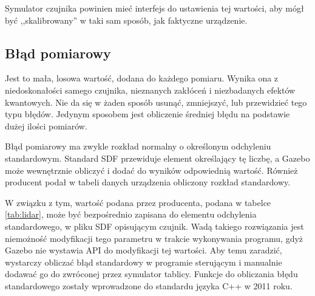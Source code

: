 Symulator czujnika powinien mieć interfejs do ustawienia tej wartości, aby mógł być ,,skalibrowany'' w taki sam sposób, jak faktyczne urządzenie.

\subsection{Błąd pomiarowy}
Jest to mała, losowa wartość, dodana do każdego pomiaru.
Wynika ona z niedoskonałości samego czujnika, nieznanych zakłóceń i niezbadanych efektów kwantowych.
Nie da się w żaden sposób usunąć, zmniejszyć, lub przewidzieć tego typu błędów.
Jedynym sposobem jest obliczenie średniej błędu na podstawie dużej ilości pomiarów.

Błąd pomiarowy ma zwykle rozkład normalny o określonym odchyleniu standardowym.
Standard SDF przewiduje element określający tę liczbę, a Gazebo może wewnętrznie obliczyć i dodać do wyników odpowiednią wartość.
Również producent podał w tabeli danych urządzenia obliczony rozkład standardowy.

W związku z tym, wartość podana przez producenta, podana w tabelce \ref{tab:lidar}, może być bezpośrednio zapisana do 
elementu odchylenia standardowego, w pliku SDF opisującym czujnik.
Wadą takiego rozwiązania jest niemożność modyfikacji tego parametru w trakcie wykonywania programu, gdyż Gazebo nie wystawia API do modyfikacji tej wartości.
Aby temu zaradzić, wystarczy obliczać błąd standardowy w programie sterującym i manualnie dodawać go do zwróconej przez symulator tablicy.
Funkcje do obliczania błędu standardowego zostały wprowadzone do standardu języka C++ w 2011 roku.



